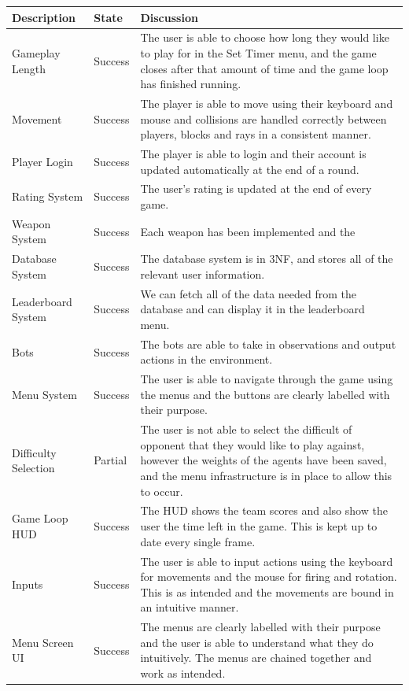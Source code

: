 \begin{center}
\begin{longtable}[c]{|p{4.5cm}|p{4cm}|p{5.7cm}|}
    \hline
    Description & State & Discussion\\
    \hline
    \hline
    Gameplay Length & Success & The user is able to choose how long they would like to play for in the Set Timer menu, and the game closes after that amount of time and the game loop has finished running.\\
    \hline
    Movement & Success & The player is able to move using their keyboard and mouse and collisions are handled correctly between players, blocks and rays in a consistent manner.\\
    \hline
    Player Login & Success & The player is able to login and their account is updated automatically at the end of a round.\\
    \hline
    Rating System & Success & The user's rating is updated at the end of every game.\\
    \hline
    Weapon System & Success & Each weapon has been implemented and the \\
    \hline
    Database System & Success & The database system is in 3NF, and stores all of the relevant user information.\\
    \hline
    Leaderboard System & Success & We can fetch all of the data needed from the database and can display it in the leaderboard menu.\\
    \hline
    Bots & Success & The bots are able to take in observations and output actions in the environment.\\
    \hline
    Menu System & Success & The user is able to navigate through the game using the menus and the buttons are clearly labelled with their purpose.\\
    \hline
    Difficulty Selection & Partial & The user is not able to select the difficult of opponent that they would like to play against, however the weights of the agents have been saved, and the menu infrastructure is in place to allow this to occur.\\
    \hline
    Game Loop HUD & Success & The HUD shows the team scores and also show the user the time left in the game. This is kept up to date every single frame.\\
    \hline
    Inputs & Success & The user is able to input actions using the keyboard for movements and the mouse for firing and rotation. This is as intended and the movements are bound in an intuitive manner.\\
    \hline
    Menu Screen UI & Success & The menus are clearly labelled with their purpose and the user is able to understand what they do intuitively. The menus are chained together and work as intended.\\
    \hline
\end{longtable}
\end{center}

